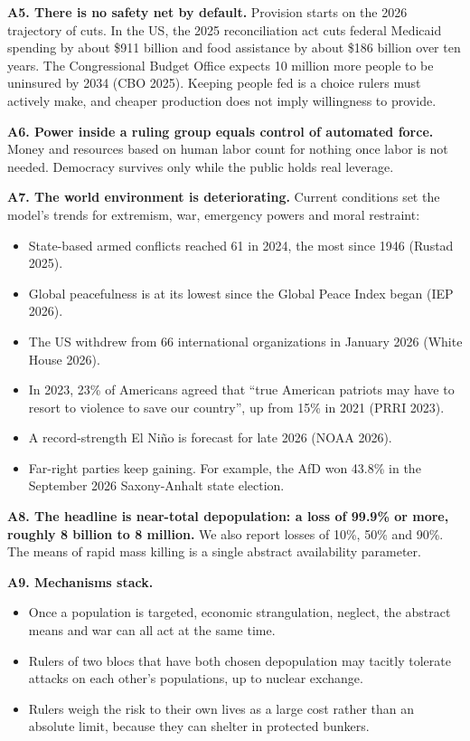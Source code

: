 \documentclass[
  10pt,
]{article}
\providecommand{\tightlist}{%
  \setlength{\itemsep}{0pt}\setlength{\parskip}{0pt}}
\begin{document}
\textbf{A5. There is no safety net by default.} Provision starts on the 2026 trajectory of cuts. In
the US, the 2025 reconciliation act cuts federal Medicaid spending by about \$911 billion and food
assistance by about \$186 billion over ten years. The Congressional Budget Office expects 10 million
more people to be uninsured by 2034 (CBO 2025). Keeping people fed is a choice rulers must actively
make, and cheaper production does not imply willingness to provide.

\textbf{A6. Power inside a ruling group equals control of automated force.} Money and resources
based on human labor count for nothing once labor is not needed. Democracy survives only while the
public holds real leverage.

\textbf{A7. The world environment is deteriorating.} Current conditions set the model's trends for
extremism, war, emergency powers and moral restraint:

\begin{itemize}
\tightlist
\item
  State-based armed conflicts reached 61 in 2024, the most since 1946 (Rustad 2025).
\item
  Global peacefulness is at its lowest since the Global Peace Index began (IEP 2026).
\item
  The US withdrew from 66 international organizations in January 2026 (White House 2026).
\item
  In 2023, 23\% of Americans agreed that ``true American patriots may have to resort to violence to
  save our country'', up from 15\% in 2021 (PRRI 2023).
\item
  A record-strength El Niño is forecast for late 2026 (NOAA 2026).
\item
  Far-right parties keep gaining. For example, the AfD won 43.8\% in the September 2026
  Saxony-Anhalt state election.
\end{itemize}

\textbf{A8. The headline is near-total depopulation: a loss of 99.9\% or more, roughly 8 billion to
8 million.} We also report losses of 10\%, 50\% and 90\%. The means of rapid mass killing is a
single abstract availability parameter.

\textbf{A9. Mechanisms stack.}

\begin{itemize}
\tightlist
\item
  Once a population is targeted, economic strangulation, neglect, the abstract means and war can all
  act at the same time.
\item
  Rulers of two blocs that have both chosen depopulation may tacitly tolerate attacks on each
  other's populations, up to nuclear exchange.
\item
  Rulers weigh the risk to their own lives as a large cost rather than an absolute limit, because
  they can shelter in protected bunkers.
\end{itemize}
\end{document}
